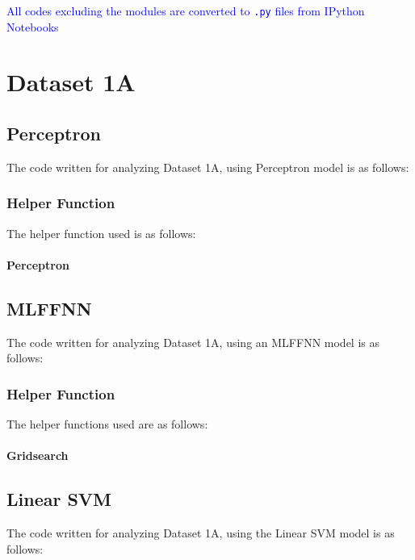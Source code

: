 \documentclass[11pt,a4paper]{article}
\newcommand{\noi}{\noindent}
\def\tt#1{\texttt{#1}}
\begin{document}
{\hypersetup{linkcolor=black}
 \tableofcontents}
\break

\noi
\textcolor{blue}{All codes excluding the modules are converted to \tt{.py} files from IPython Notebooks}

\section{Dataset 1A}
\subsection{Perceptron}
The code written for analyzing Dataset 1A, using Perceptron model is as follows:\vspace{-1em}


\subsubsection{Helper Function}
The helper function used is as follows:\vspace{-1em}
\paragraph{Perceptron}
\vspace{-1.5em}


\subsection{MLFFNN}
The code written for analyzing Dataset 1A, using an MLFFNN model is as follows:\vspace{-1em}


\subsubsection{Helper Function}
The helper functions used are as follows:\vspace{-1em}
\paragraph{Gridsearch}
\vspace{-1.5em}



\subsection{Linear SVM}
The code written for analyzing Dataset 1A, using the Linear SVM model is as follows:\vspace{-1em}

\end{document}

